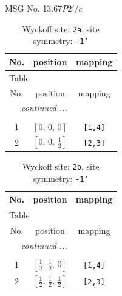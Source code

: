 \documentclass[fleqn,8pt]{jsarticle}
\begin{document}
\setcounter{MaxMatrixCols}{32}

\renewcommand{\tablename}{Table~}
\renewcommand{\figurename}{Figure~}
\begin{center}
\LARGE
MSG No. 13.67\quad$P2'/c$
\end{center}
\renewcommand{\arraystretch}{1.2}
\begin{longtable}{ccc}
\caption{Wyckoff site: {\tt 2a}, site symmetry: {\tt -1'}}
 \\
 \hline \hline
No. & position & mapping \\ \hline \endfirsthead

\multicolumn{2}{l}{\tablename\ \thetable{}} \\
 \hline \hline
No. & position & mapping \\ \hline \endhead

 \hline \hline
\multicolumn{2}{r}{\footnotesize\it continued ...} \\ \endfoot

 \hline \hline
\multicolumn{2}{r}{} \\ \endlastfoot

1 & $\left[ 0,\, 0,\, 0 \right]$ & {\tt [1,4]} \\ \hline
2 & $\left[ 0,\, 0,\, \frac{1}{2} \right]$ & {\tt [2,3]} \\
\end{longtable}
\renewcommand{\arraystretch}{1.2}
\begin{longtable}{ccc}
\caption{Wyckoff site: {\tt 2b}, site symmetry: {\tt -1'}}
 \\
 \hline \hline
No. & position & mapping \\ \hline \endfirsthead

\multicolumn{2}{l}{\tablename\ \thetable{}} \\
 \hline \hline
No. & position & mapping \\ \hline \endhead

 \hline \hline
\multicolumn{2}{r}{\footnotesize\it continued ...} \\ \endfoot

 \hline \hline
\multicolumn{2}{r}{} \\ \endlastfoot

1 & $\left[ \frac{1}{2},\, \frac{1}{2},\, 0 \right]$ & {\tt [1,4]} \\ \hline
2 & $\left[ \frac{1}{2},\, \frac{1}{2},\, \frac{1}{2} \right]$ & {\tt [2,3]} \\
\end{longtable}
\renewcommand{\arraystretch}{1.2}
\end{document}
